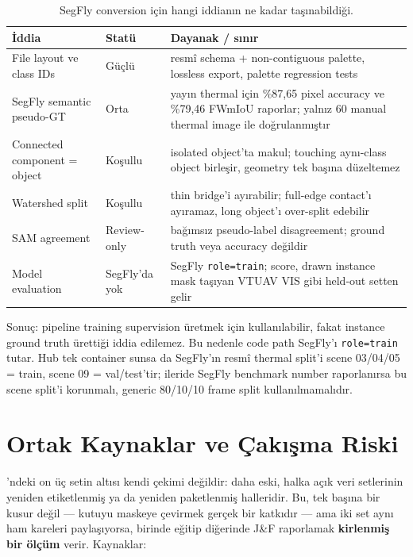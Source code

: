 \begin{table}[H]
  \centering
  \caption{SegFly conversion için hangi iddianın ne kadar taşınabildiği.}
  \label{tab:segfly-guvenilirlik}
  \small
  \begin{tabular}{@{}p{39mm}p{23mm}p{78mm}@{}}
    \toprule
    İddia & Statü & Dayanak / sınır \\
    \midrule
    File layout ve class IDs & Güçlü & resmî schema + non-contiguous
      palette, lossless export, palette regression tests \\
    SegFly semantic pseudo-GT & Orta & yayın thermal için \%87,65 pixel
      accuracy ve \%79,46 FWmIoU raporlar; yalnız 60 manual thermal image ile
      doğrulanmıştır~\cite{segfly2026} \\
    Connected component = object & Koşullu & isolated object'ta makul;
      touching aynı-class object birleşir, geometry tek başına düzeltemez \\
    Watershed split & Koşullu & thin bridge'i ayırabilir; full-edge contact'ı
      ayıramaz, long object'ı over-split edebilir \\
    SAM agreement & Review-only & bağımsız pseudo-label disagreement;
      ground truth veya accuracy değildir \\
    Model evaluation & SegFly'da yok & SegFly \texttt{role=train}; score,
      drawn instance mask taşıyan VTUAV VIS gibi held-out setten gelir \\
    \bottomrule
  \end{tabular}
\end{table}

Sonuç: pipeline training supervision üretmek için kullanılabilir, fakat
instance ground truth ürettiği iddia edilemez. Bu nedenle code path SegFly'ı
\texttt{role=train} tutar. Hub tek container sunsa da SegFly'ın resmî thermal
split'i scene 03/04/05 = train, scene 09 = val/test'tir; ileride SegFly
benchmark number raporlanırsa bu scene split'i korunmalı, generic 80/10/10
frame split kullanılmamalıdır.

\section{Ortak Kaynaklar ve Çakışma Riski}
\label{sec:ortak-kaynaklar}

'ndeki on üç setin altısı kendi çekimi değildir:
daha eski, halka açık veri setlerinin yeniden etiketlenmiş ya da
yeniden paketlenmiş halleridir. Bu, tek başına bir kusur değil ---
kutuyu maskeye çevirmek gerçek bir katkıdır --- ama iki set aynı ham
kareleri paylaşıyorsa, birinde eğitip diğerinde J\&F raporlamak
\textbf{kirlenmiş bir ölçüm} verir. Kaynaklar:


